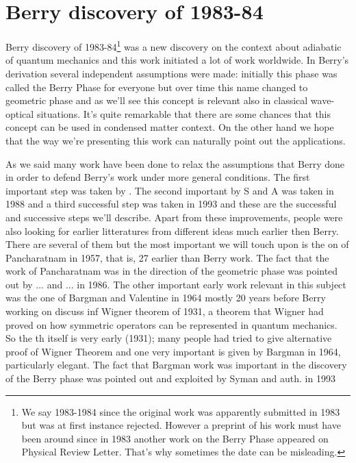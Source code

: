 
\chapter{Berry discovery of 1983-84}
Berry discovery of 1983-84\footnote{We say 1983-1984 since the original work was apparently submitted in 1983 but was at first instance rejected. However a preprint of his work must have been around since in 1983 another work on the Berry Phase appeared on Physical Review Letter. That's why sometimes the date can be misleading.} was a new discovery on the context about adiabatic of quantum mechanics and this work initiated a lot of work worldwide. In Berry's derivation several independent assumptions were made: initially this phase was called the Berry Phase for everyone but over time this name changed to geometric phase and as we'll see this concept is relevant also in classical wave-optical situations. It's quite remarkable that there are some chances that this concept can be used in condensed matter context. On the other hand we hope that the way we're presenting this work can naturally point out the applications.

As we said many work have been done to relax the assumptions that Berry done in order to defend Berry's work under more general conditions. The first important step was taken by \citet{aharonov1987phase}.
The second important by S and A was taken in 1988 and a third successful step was taken in 1993 and these are the successful and successive steps we'll describe. Apart from these improvements, people were also looking for earlier litteratures from different ideas much earlier then Berry. There are several of them but the most important we will touch upon is the on of Pancharatnam\citet{pancharatnam1956generalized} in 1957, that is, 27 earlier than Berry work. The fact that the work of Pancharatnam was in the direction of the geometric phase was pointed out by ... and ... in 1986. The other important early work relevant in this subject was the one of Bargman and Valentine in 1964 mostly 20 years before Berry working on discuss inf Wigner theorem of 1931, a theorem that Wigner had proved on how symmetric operators can be represented in quantum mechanics. So the th itself is very early (1931); many people had tried to give alternative proof of Wigner Theorem and one very important is given by Bargman in 1964, particularly elegant. The fact that Bargman work was important in the discovery of the Berry phase was pointed out and exploited by Syman and auth. in 1993

